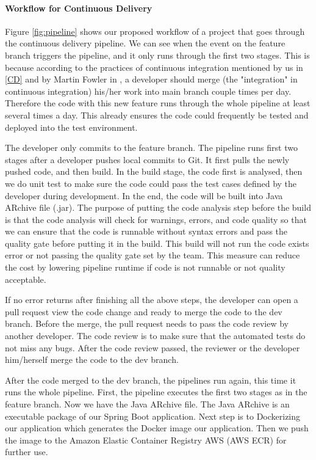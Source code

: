 \paragraph[]{Workflow for Continuous Delivery}
\label{workflow}
Figure \ref{fig:pipeline} shows our proposed workflow of a project that goes through the continuous delivery pipeline.
We can see when the event on the feature branch triggers the pipeline, and it only runs through the first two stages. This is because according to the practices of continuous integration mentioned by us in \ref{CD} and by Martin Fowler in \cite{fowler2006continuous}, a developer should merge (the "integration" in continuous integration) his/her work into main branch couple times per day. Therefore the code with this new feature runs through the whole pipeline at least several times a day. This already ensures the code could frequently be tested and deployed into the test environment.
\par
The developer only commits to the feature branch. The pipeline runs first two stages after a developer pushes local commits to Git. It first pulls the newly pushed code, and then build. In the build stage, the code first is analysed, then we do unit test to make sure the code could pass the test cases defined by the developer during development. In the end, the code will be built into Java ARchive file (.jar). The purpose of putting the code analysis step before the build is that the code analysis will check for warnings, errors, and code quality so that we can ensure that the code is runnable without syntax errors and pass the quality gate before putting it in the build. This build will not run the code exists error or not passing the quality gate set by the team. This measure can reduce the cost by lowering pipeline runtime if code is not runnable or not quality acceptable. 
\par
If no error returns after finishing all the above steps, the developer can open a pull request view the code change and ready to merge the code to the dev branch. Before the merge, the pull request needs to pass the code review by another developer. The code review is to make sure that the automated tests do not miss any bugs. After the code review passed, the reviewer or the developer him/herself merge the code to the dev branch.  
\par
After the code merged to the dev branch, the pipelines run again, this time it runs the whole pipeline. First, the pipeline executes the first two stages as in the feature branch. Now we have the Java ARchive file. The Java ARchive is an executable package of our Spring Boot application. Next step is to Dockerizing our application which generates the Docker image our application. Then we push the image to the Amazon Elastic Container Registry AWS (AWS ECR) for further use.
